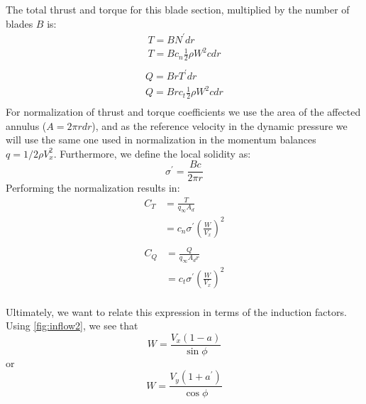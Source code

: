 \documentclass{article}
\begin{document}
The total thrust and torque for this blade section, multiplied by the number of blades $B$ is:
\begin{equation}
    \begin{aligned}
        T = B N^\prime dr\\
        T = B c_n \frac{1}{2}\rho W^2 c dr\\
    \end{aligned}
    \label{eq:beT}
\end{equation}
\begin{equation}
    \begin{aligned}
        Q = B r T^\prime dr\\
        Q = B r c_t \frac{1}{2}\rho W^2 c dr\\
    \end{aligned}
    \label{eq:beQ}
\end{equation}
For normalization of thrust and torque coefficients we use the area of the affected annulus ($A = 2 \pi r dr$), and as the reference velocity in the dynamic pressure we will use the same one used in normalization in the momentum balances $q = 1/2 \rho V_x^2$.  Furthermore, we define the local solidity as:
\begin{equation}
    \sigma^\prime = \frac{B c}{2 \pi r}
\end{equation}
Performing the normalization results in:
\begin{equation}
    \begin{aligned}
        C_T &= \frac{T}{q_\infty A_d}\\
         &= c_n \sigma^\prime \left(\frac{W}{V_x}\right)^2\\
     \end{aligned}
 \end{equation}
 \begin{equation}
     \begin{aligned}
        C_Q &= \frac{Q}{q_\infty A_d r}\\
         &= c_t \sigma^\prime \left(\frac{W}{V_x}\right)^2\\
    \end{aligned}
\end{equation}

Ultimately, we want to relate this expression in terms of the induction factors.  Using \cref{fig:inflow2}, we see that
\begin{equation}
    W = \frac{V_x (1 - a)}{\sin \phi}
\end{equation}
or
\begin{equation}
    W = \frac{V_y (1 + a^\prime)}{\cos \phi}
\end{equation}
\end{document}
